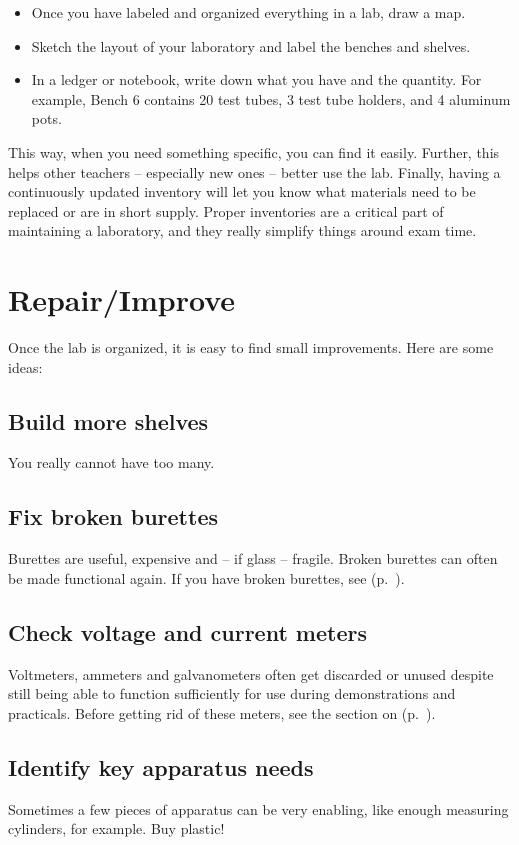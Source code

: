 \begin{itemize}
\item Once you have labeled and organized everything in a lab, 
draw a map. 
\item Sketch the layout of your laboratory 
and label the benches and shelves. 
\item In a ledger or notebook, 
write down what you have and the quantity. 
For example, 
Bench 6 contains 20 test tubes, 
3 test tube holders, 
and 4 aluminum pots. 
\end{itemize}
This way, 
when you need something specific, 
you can find it easily. 
Further, 
this helps other teachers -- especially new ones -- better use the lab. 
Finally, 
having a continuously updated inventory will let you know what 
materials need to be replaced or are in short supply. 
Proper inventories are a critical part of maintaining a laboratory, 
and they really simplify things around exam time.


\section{Repair/Improve}

Once the lab is organized, 
it is easy to find small improvements. 
Here are some ideas:

\subsection{Build more shelves}
You really cannot have too many.

\subsection{Fix broken burettes}
Burettes are useful, 
expensive and -- if glass -- fragile. 
Broken burettes can often be made functional again. 
If you have broken burettes, 
see  (p.~\pageref{cha:burettes}).

\subsection{Check voltage and current meters}
Voltmeters, ammeters and galvanometers often get discarded or unused despite still being able to function sufficiently for use during demonstrations and practicals. Before getting rid of these meters, see the section on  (p.~\pageref{cha:voltamm}).

\subsection{Identify key apparatus needs}
Sometimes a few pieces of apparatus can be very enabling, 
like enough measuring cylinders, 
for example. 
Buy plastic!

